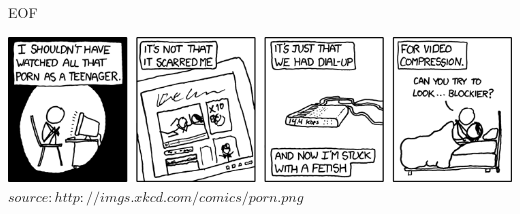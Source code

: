 		
	\begin{frame} {EOF}
		\begin{center}
			\includegraphics[scale=0.45]{graphics/eof8.png}\\
			\tiny $source: http://imgs.xkcd.com/comics/porn.png$
		\end{center}
	\end{frame}


